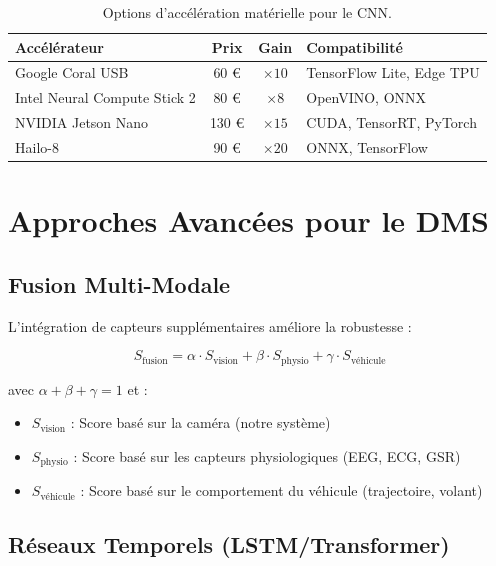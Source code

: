 \begin{table}[H]
\centering
\caption{Options d'accélération matérielle pour le CNN.}
\label{tab:hw_acceleration}
\renewcommand{\arraystretch}{1.3}
\begin{tabularx}{\textwidth}{|l|c|c|X|}
\hline
\rowcolor{stellantisblue!15}
\textbf{Accélérateur} & \textbf{Prix} & \textbf{Gain} & \textbf{Compatibilité} \\
\hline
Google Coral USB & 60 € & $\times 10$ & TensorFlow Lite, Edge TPU \\
\hline
Intel Neural Compute Stick 2 & 80 € & $\times 8$ & OpenVINO, ONNX \\
\hline
NVIDIA Jetson Nano & 130 € & $\times 15$ & CUDA, TensorRT, PyTorch \\
\hline
Hailo-8 & 90 € & $\times 20$ & ONNX, TensorFlow \\
\hline
\end{tabularx}
\end{table}

\section{Approches Avancées pour le DMS}

\subsection{Fusion Multi-Modale}

L'intégration de capteurs supplémentaires améliore la robustesse :

\begin{equation}
S_{\text{fusion}} = \alpha \cdot S_{\text{vision}} + \beta \cdot S_{\text{physio}} + \gamma \cdot S_{\text{véhicule}}
\label{eq:multimodal_fusion}
\end{equation}

avec $\alpha + \beta + \gamma = 1$ et :
\begin{itemize}
    \item $S_{\text{vision}}$ : Score basé sur la caméra (notre système)
    \item $S_{\text{physio}}$ : Score basé sur les capteurs physiologiques (EEG, ECG, GSR)
    \item $S_{\text{véhicule}}$ : Score basé sur le comportement du véhicule (trajectoire, volant)
\end{itemize}

\subsection{Réseaux Temporels (LSTM/Transformer)}

